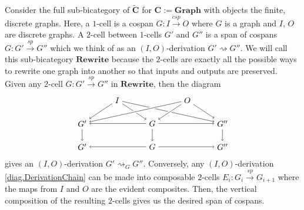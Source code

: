 \documentclass[11pt]{amsart}
\newcommand{\cat}[1]{\mathbf{#1}}
\newcommand{\from}{\colon}
\renewcommand{\span}{\xrightarrow{\mathit{sp}}}
\newcommand{\cospan}{\xrightarrow{\mathit{csp}}}
\newcommand{\csC}{\widetilde{\mathbf{C}}}
\theoremstyle{remark}
\theoremstyle{definition}
\begin{document}
Consider the full sub-bicategory of $\csC$ for $\cat{C} := \cat{Graph}$ with objects the finite, discrete graphs. Here, a $1$-cell is a cospan $G \from I \cospan O$ where $G$ is a graph and $I$, $O$ are discrete graphs.  A $2$-cell between $1$-cells $G'$ and $G''$ is a span of cospans $G \from G' \span G''$ which we think of as an $(I,O)$-derivation $G' \rightsquigarrow G''$.  We will call this sub-bicategory $\cat{Rewrite}$ because the $2$-cells are exactly all the possible ways to rewrite one graph into another so that inputs and outputs are preserved. Given any $2$-cell $G \from G' \span G''$ in $\cat{Rewrite}$, then the diagram 
\[
\begin{tikzpicture}
	\node (I) at (1.5,2) {$I$};
	\node (O) at (4.5,2) {$O$};
	\node (L) at (0,1) {$G'$};
	\node (K) at (3,1) {$G$};
	\node (R) at (6,1) {$G''$};
	\node (G) at (0,0) {$G'$};
	\node (E) at (3,0) {$G$};
	\node (G') at (6,0) {$G''$};
	\draw [->] (I) edge (L);
	\draw [->] (I) edge (K);
	\draw [->] (I) edge (R);
	\draw [->] (K) edge (L);
	\draw [->] (K) edge (E);
	\draw [->] (K) edge (R);
	\draw [->] (L) edge (G);
	\draw [->] (R) edge (G');
	\draw [->] (E) edge (G);
	\draw [->] (E) edge (G');
	\draw [-] (O) edge[white,line width=3pt] (L);
	\draw [->] (O) edge (L);
	\draw [-] (O) edge[white,line width=3pt] (K);
	\draw [->] (O) edge (K);
	\draw [-] (O) edge[white,line width=3pt] (R);
	\draw [->] (O) edge (R);
\end{tikzpicture}
\]
gives an $(I,O)$-derivation $G' \rightsquigarrow_G G''$. Conversely, any $(I,O)$-derivation \eqref{diag.DerivationChain} can be made into composable $2$-cells $E_i \from G_i \span G_{i+1}$ where the maps from $I$ and $O$ are the evident composites. Then, the vertical composition of the resulting $2$-cells gives us the desired span of cospans.
\end{document}
